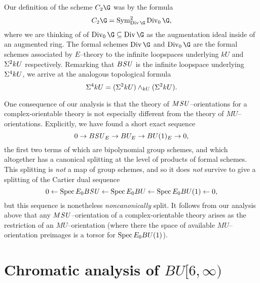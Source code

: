 \begin{remark}
Our definition of the scheme \(C_2 \G\) was by the formula \[C_2 \G = \Sym^2_{\Div \G} \Div_0 \G,\] where we are thinking of of \(\Div_0 \G \subseteq \Div \G\) as the augmentation ideal inside of an augmented ring.  The formal schemes \(\Div \G\) and \(\Div_0 \G\) are the formal schemes associated by \(E\)--theory to the infinite loopspaces underlying \(kU\) and \(\Sigma^2 kU\) respectively.  Remarking that \(B\mathit{SU}\) is the infinite loopspace underlying \(\Sigma^4 kU\), we arrive at the analogous topological formula \[\Sigma^4 kU = (\Sigma^2 kU) \wedge_{kU} (\Sigma^2 kU).\]
\end{remark}

\begin{remark}
One consequence of our analysis is that the theory of \(M\mathit{SU}\)--orientations for a complex-orientable theory is not especially different from the theory of \(MU\)--orientations.  Explicitly, we have found a short exact sequence \[0 \to B\mathit{SU}_E \to BU_E \to BU(1)_E \to 0,\] the first two terms of which are bipolynomial group schemes, and which altogether has a canonical splitting at the level of products of formal schemes.  This splitting is \emph{not} a map of group schemes, and so it does \emph{not} survive to give a splitting of the Cartier dual sequence \[0 \leftarrow \operatorname{Spec} E_0 B\mathit{SU} \leftarrow \operatorname{Spec} E_0 BU \leftarrow \operatorname{Spec} E_0 BU(1) \leftarrow 0,\] but this sequence is nonetheless \emph{noncanonically} split.  It follows from our analysis above that any \(M\mathit{SU}\)--orientation of a complex-orientable theory arises as the restriction of an \(MU\)--orientation (where there the space of available \(MU\)--orientation preimages is a torsor for \(\operatorname{Spec} E_0 BU(1)\)).
\end{remark}












\section{Chromatic analysis of \texorpdfstring{\(BU[6, \infty)\)}{BU[6, oo)}}\label{ChromaticKUCoopnsSection}

